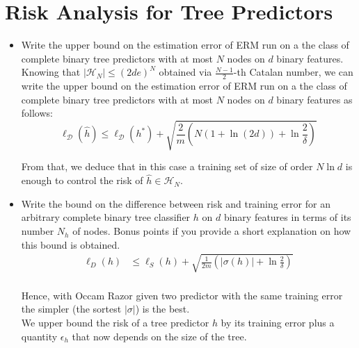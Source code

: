 \newpage
\section{Risk Analysis for Tree Predictors}

\begin{itemize}
   
    \item Write the upper bound on the estimation error of ERM run on a the class of complete binary tree predictors with at most $N$ nodes on $d$ binary features.\\

        Knowing that $|\mathcal{H}_N| \leq (2de)^N$ obtained via $\frac{N-1}{2}$-th Catalan number, we can write the upper bound on the estimation error of ERM run on a the class of complete binary tree predictors with at most $N$ nodes on $d$ binary features as follows:
        $$
        \ell_{\mathcal{D}}(\hat{h}) \leq \ell_{\mathcal{D}}(h^{*}) + \sqrt{\frac{2}{m} \left(N(1 + \ln (2d)) + \ln \frac{2}{\delta} \right)}
        $$

        From that, we deduce that in this case a training set of size of order $N \ln d$ is enough to control the risk of $\hat{h} \in \mathcal{H}_N$.\\

    \item Write the bound on the difference between risk and training error for an arbitrary complete binary tree classifier $h$ on $d$ binary features in terms of its number $N_h$ of nodes. Bonus points if you provide a short explanation on how this bound is obtained.\\
    
        \begin{equation}
            \begin{split}
                \ell_{D}(h) & \leq \ell_{S}(h) + \sqrt{\frac{1}{2m} \left(|\sigma(h)| + \ln \frac{2}{\delta} \right)}\\
            \end{split}
        \end{equation}

        Hence, with Occam Razor given two predictor with the same training error the simpler (the sortest $|\sigma|$) is the best.\\ 

        We upper bound the risk of a tree predictor $h$ by its training error plus a quantity $\epsilon_h$ that now depends on the size of the tree.


\end{itemize}
